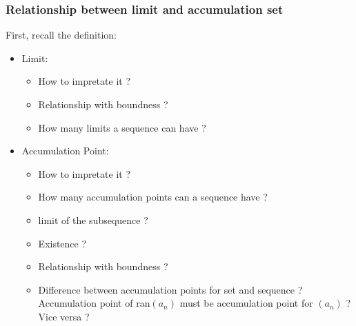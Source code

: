 \documentclass{beamer}
\begin{document}
\begin{frame}
    \frametitle{Relationship between limit and accumulation set}
    First, recall the definition:
    \begin{itemize}
        \item Limit:
              \begin{itemize}
                  \item How to impretate it ?
                  \item Relationship with boundness ?
                  \item How many limits a sequence can have ?
              \end{itemize}
        \item Accumulation Point:
              \begin{itemize}
                  \item How to impretate it ?
                  \item How many accumulation points can a sequence have ?
                  \item limit of the subsequence ?
                  \item Existence ?
                  \item Relationship with boundness ?
                  \item Difference between accumulation points for set and sequence ?
                        Accumulation point of ran$(a_{n})$ must be accumulation point for $(a_{n})$ ?
                        Vice versa ?
              \end{itemize}
    \end{itemize}
\end{frame}
\end{document}
